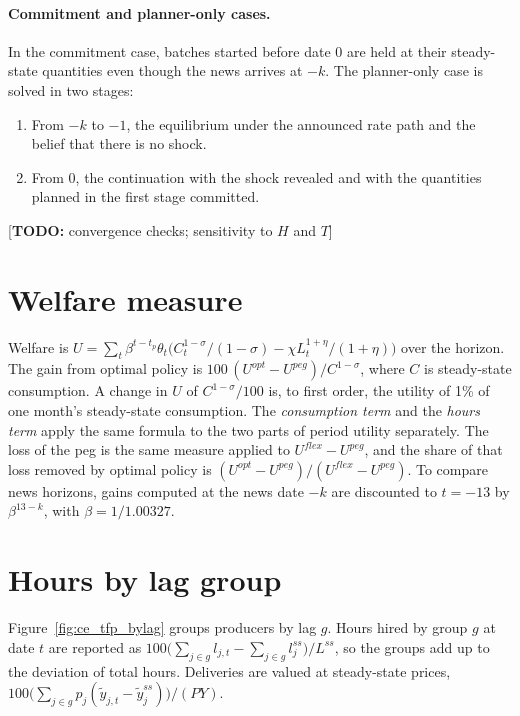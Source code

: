 \documentclass[11pt]{article}
\theoremstyle{definition}
\newcommand{\todo}[1]{{\color{red}\small[\textbf{TODO:} #1]}}
\begin{document}
\paragraph{Commitment and planner-only cases.} In the commitment case, batches started before date 0
are held at their steady-state quantities even though the news arrives at $-k$. The planner-only case
is solved in two stages:
\begin{enumerate}
  \item From $-k$ to $-1$, the equilibrium under the announced rate path and the belief that there is
        no shock.
  \item From 0, the continuation with the shock revealed and with the quantities planned in the first
        stage committed.
\end{enumerate}
\todo{convergence checks; sensitivity to $H$ and $T$}

\section{Welfare measure}\label{app:welfare}

Welfare is $U=\sum_{t}\beta^{t-t_p}\theta_t\bigl(C_t^{1-\sigma}/(1-\sigma)-\chi L_t^{1+\eta}/(1+\eta)\bigr)$
over the horizon. The gain from optimal policy is $100\,(U^{opt}-U^{peg})/C^{1-\sigma}$, where $C$ is
steady-state consumption. A change in $U$ of $C^{1-\sigma}/100$ is, to first order, the utility of 1\% of
one month's steady-state consumption. The \emph{consumption term} and the \emph{hours term} apply the
same formula to the two parts of period utility separately. The loss of the peg is the same measure
applied to $U^{flex}-U^{peg}$, and the share of that loss removed by optimal policy is
$(U^{opt}-U^{peg})/(U^{flex}-U^{peg})$. To compare news horizons, gains computed at the news date
$-k$ are discounted to $t=-13$ by $\beta^{13-k}$, with $\beta=1/1.00327$.

\section{Hours by lag group}\label{app:lags}

Figure~\ref{fig:ce_tfp_bylag} groups producers by lag $g$. Hours hired by group $g$ at date $t$ are
reported as $100\bigl(\sum_{j\in g}l_{j,t}-\sum_{j\in g}l_j^{ss}\bigr)/L^{ss}$, so the groups add up to the
deviation of total hours. Deliveries are valued at steady-state prices,
$100\bigl(\sum_{j\in g}p_j(\tilde y_{j,t}-\tilde y_j^{ss})\bigr)/(PY)$.
\end{document}
